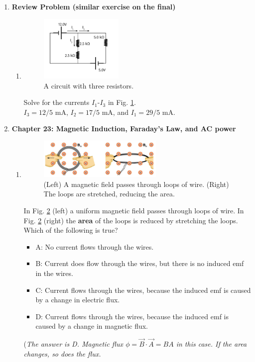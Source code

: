 \documentclass[10pt]{article}
\begin{document}
\begin{enumerate}
\item \textbf{Review Problem (similar exercise on the final)}
\begin{enumerate}
\item 
\begin{figure}[ht]
\centering
\includegraphics[width=0.4\textwidth]{iV.pdf}
\caption{\label{fig:circuit1} A circuit with three resistors.}
\end{figure}
Solve for the currents $I_1$-$I_3$ in Fig. \ref{fig:circuit1}. \\ $I_3 = 12/5$ mA, $I_2 = 17/5$ mA, and $I_1 = 29/5$ mA.
\end{enumerate} \clearpage
\item \textbf{Chapter 23: Magnetic Induction, Faraday's Law, and AC power}
\begin{enumerate}
\item
\begin{figure}
\centering
\includegraphics[width=0.6\textwidth]{flux1.png}
\caption{\label{fig:flux1} (Left) A magnetic field passes through loops of wire.  (Right) The loops are stretched, reducing the area.}
\end{figure}
In Fig. \ref{fig:flux1} (left) a uniform magnetic field passes through loops of wire.  In Fig. \ref{fig:flux1} (right) the \textbf{area} of the loops is reduced by stretching the loops.  Which of the following is true?
\begin{itemize}
\item A: No current flows through the wires.
\item B: Current does flow through the wires, but there is no induced emf in the wires.
\item C: Current flows through the wires, because the induced emf is caused by a change in electric flux.
\item D: Current flows through the wires, because the induced emf is caused by a change in magnetic flux.
\end{itemize}
(\textit{The answer is D. Magnetic flux $\phi = \vec{B} \cdot \vec{A} = BA$ in this case.  If the area changes, so does the flux.}
\end{enumerate}
\end{enumerate}
\end{document}
